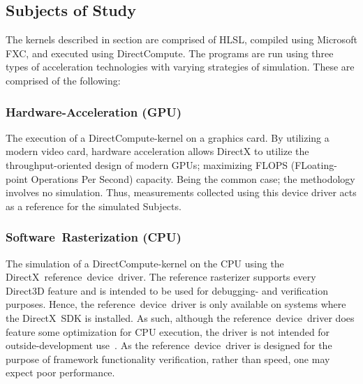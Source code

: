 \subsection{Subjects of Study}
\label{sec:contribution:subjectsofstudy}
The kernels described in section  are comprised of HLSL, compiled using Microsoft FXC, and executed using DirectCompute.
The programs are run using three types of acceleration technologies with varying strategies of simulation.
These are comprised of the following:

\subsubsection{Hardware-Acceleration (GPU)}
The execution of a DirectCompute-kernel on a graphics card.
By utilizing a modern video card, hardware acceleration allows DirectX to utilize the throughput-oriented design of modern GPUs; maximizing FLOPS (FLoating-point Operations Per Second) capacity.
Being the common case; the methodology involves no simulation.
Thus, measurements collected using this device driver acts as a reference for the simulated Subjects.

\subsubsection{Software~Rasterization (CPU)}
The simulation of a DirectCompute-kernel on the CPU using the DirectX~reference~device~driver.
The reference rasterizer supports every Direct3D feature and is intended to be used for debugging- and verification purposes.
Hence, the reference~device~driver is only available on systems where the DirectX~SDK is installed.
As such, although the reference~device~driver does feature some optimization for CPU execution, the driver is not intended for outside-development use~.
As the reference~device~driver is designed for the purpose of framework functionality verification, rather than speed, one may expect poor performance.

